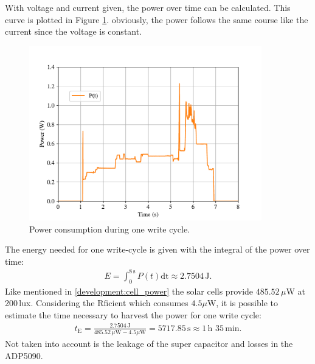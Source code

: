 With voltage and current given, the power over time can be calculated.
This curve is plotted in Figure \ref{results:p}.
obviously, the power follows the same course like the current since the voltage is constant.
\begin{figure}[ht]
	\centering
	\includegraphics[width=0.9\textwidth]{5-results/energy/logger/p.pdf}
	\caption{Power consumption during one write cycle.\label{results:p}}
\end{figure}
The energy needed for one write-cycle is given with the integral of the power over time:
\begin{align}
	E = \int_{0}^{8\,\text{s}}P(t)\text{dt}\approx 2.7504\,\text{J}\label{result:energy}.
\end{align}
Like mentioned in \eqref{development:cell_power} the solar cells provide $485.52\,\mu \text{W}$ at 200\,lux.
Considering the Rficient which consumes $4.5\mu \text{W}$, it is possible to estimate the time necessary to harvest the power for one write cycle:
\begin{align}
	t_{\text{E}}=\frac{2.7504\,\text{J}}{485.52\,\mu \text{W}-4.5\mu \text{W}}=5717.85\,\text{s}\approx 1\,\text{h } 35\,\text{min}.
\end{align}
Not taken into account is the leakage of the super capacitor and losses in the ADP5090.

